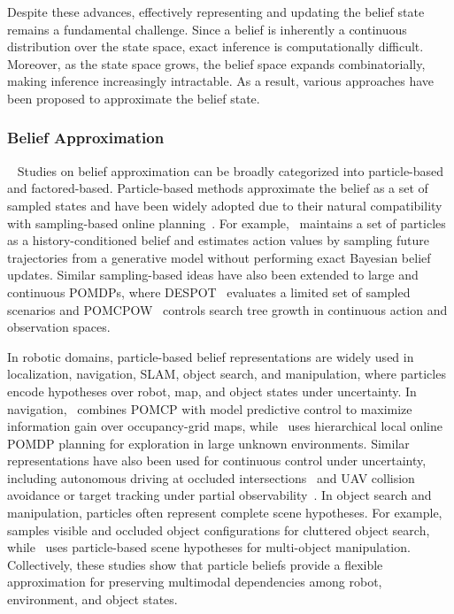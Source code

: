 Despite these advances, effectively representing and updating the belief state remains a fundamental challenge. Since a belief is inherently a continuous distribution over the state space, exact inference is computationally difficult. Moreover, as the state space grows, the belief space expands combinatorially, making inference increasingly intractable. As a result, various approaches have been proposed to approximate the belief state.

\subsubsection{Belief Approximation}~\label{rel:pu_belief_approx}
Studies on belief approximation can be broadly categorized into particle-based and factored-based. Particle-based methods approximate the belief as a set of sampled states and have been widely adopted due to their natural compatibility with sampling-based online planning~\cite{doshi2005particle, lim2023optimality}. For example,~\cite{silver2010monte} maintains a set of particles as a history-conditioned belief and estimates action values by sampling future trajectories from a generative model without performing exact Bayesian belief updates. Similar sampling-based ideas have also been extended to large and continuous POMDPs, where DESPOT~\cite{somani2013despot} evaluates a limited set of sampled scenarios and POMCPOW~\cite{sunberg2018pomcpow} controls search tree growth in continuous action and observation spaces.


In robotic domains, particle-based belief representations are widely used in localization, navigation, SLAM, object search, and manipulation, where particles encode hypotheses over robot, map, and object states under uncertainty. In navigation,~\cite{lauri2016exploration} combines POMCP with model predictive control to maximize information gain over occupancy-grid maps, while~\cite{kim2021plgrim} uses hierarchical local online POMDP planning for exploration in large unknown environments. Similar representations have also been used for continuous control under uncertainty, including autonomous driving at occluded intersections~\cite{brechtel2014continuous} and UAV collision avoidance or target tracking under partial observability~\cite{bai2011uav,vanegas2016uav}. In object search and manipulation, particles often represent complete scene hypotheses. For example,~\cite{xiao2019objectsearch} samples visible and occluded object configurations for cluttered object search, while~\cite{pajarinen2017multiobject,pajarinen2022composition} uses particle-based scene hypotheses for multi-object manipulation. Collectively, these studies show that particle beliefs provide a flexible approximation for preserving multimodal dependencies among robot, environment, and object states.



